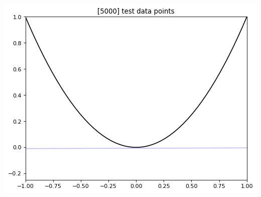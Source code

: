 \documentclass[12pt]{article}
\begin{document}
\begin{enumerate}
\begin{enumerate}
        \begin{center}\includegraphics[width=0.75\linewidth]{png/single_exp_5k_5k.png}\end{center}
        
        \pagebreak
        

\end{enumerate}
\end{enumerate}
\end{document}
